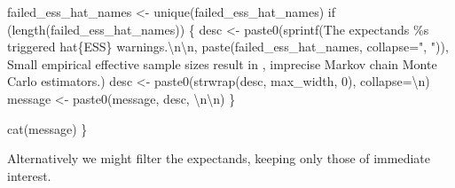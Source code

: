 \documentclass[
  letterpaper,
  DIV=11,
  numbers=noendperiod]{scrartcl}
\newenvironment{Shaded}{\begin{snugshade}}{\end{snugshade}}
\newcommand{\CharTok}[1]{\textcolor[rgb]{0.13,0.47,0.30}{#1}}
\newcommand{\ControlFlowTok}[1]{\textcolor[rgb]{0.00,0.23,0.31}{#1}}
\newcommand{\DecValTok}[1]{\textcolor[rgb]{0.68,0.00,0.00}{#1}}
\newcommand{\NormalTok}[1]{\textcolor[rgb]{0.00,0.23,0.31}{#1}}
\newcommand{\OperatorTok}[1]{\textcolor[rgb]{0.37,0.37,0.37}{#1}}
\newcommand{\SpecialCharTok}[1]{\textcolor[rgb]{0.37,0.37,0.37}{#1}}
\newcommand{\StringTok}[1]{\textcolor[rgb]{0.13,0.47,0.30}{#1}}
\begin{document}
\begin{Shaded}
\begin{Highlighting}[]
\NormalTok{  failed\_ess\_hat\_names }\OperatorTok{\textless{}{-}}\NormalTok{ unique(failed\_ess\_hat\_names)}
  \ControlFlowTok{if}\NormalTok{ (length(failed\_ess\_hat\_names)) \{}
\NormalTok{    desc }\OperatorTok{\textless{}{-}} 
\NormalTok{      paste0(sprintf(}\StringTok{\textquotesingle{}The expectands }\SpecialCharTok{\%s}\StringTok{ triggered hat}\SpecialCharTok{\{ESS\}}\StringTok{ warnings.}\CharTok{\textbackslash{}n\textbackslash{}n}\StringTok{\textquotesingle{}}\NormalTok{,}
\NormalTok{             paste(failed\_ess\_hat\_names, collapse}\OperatorTok{=}\StringTok{", "}\NormalTok{)),}
             \StringTok{\textquotesingle{}Small empirical effective sample sizes result in \textquotesingle{}}\NormalTok{,}
             \StringTok{\textquotesingle{}imprecise Markov chain Monte Carlo estimators.\textquotesingle{}}\NormalTok{)}
\NormalTok{    desc }\OperatorTok{\textless{}{-}}\NormalTok{ paste0(strwrap(desc, max\_width, }\DecValTok{0}\NormalTok{), collapse}\OperatorTok{=}\StringTok{\textquotesingle{}}\CharTok{\textbackslash{}n}\StringTok{\textquotesingle{}}\NormalTok{)}
\NormalTok{    message }\OperatorTok{\textless{}{-}}\NormalTok{ paste0(message, desc, }\StringTok{\textquotesingle{}}\CharTok{\textbackslash{}n\textbackslash{}n}\StringTok{\textquotesingle{}}\NormalTok{)}
\NormalTok{  \}}
  
\NormalTok{  cat(message)}
\NormalTok{\}}
\end{Highlighting}
\end{Shaded}

Alternatively we might filter the expectands, keeping only those of
immediate interest.
\end{document}
